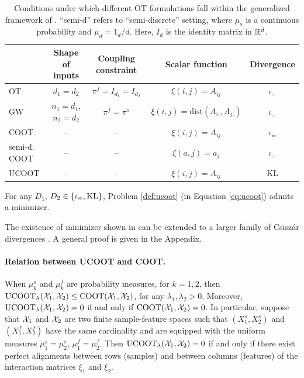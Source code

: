 \begin{table}[t]
  \centering
  \small
  \begin{tabular}{l *4c}
      \toprule
          & Shape of inputs & Coupling constraint & Scalar function & Divergence \\
      \midrule
      OT   & $d_1 = d_2$              & $\pi^f = I_{d_1} = I_{d_2}$ & $\xi(i, j) = A_{ij}$                        & $\iota_=$ \\
      GW   & $n_1 = d_1$, $n_2 = d_2$ & $\pi^f = \pi^s$             & $\xi(i, j) = \text{dist}( A_{i.}, A_{j.} )$ & $\iota_=$ \\
      COOT & --                       & --                          & $\xi(i, j) = A_{ij}$                        & $\iota_=$ \\
      semi-d. COOT & --               & --                          & $\xi(a, j) = a_j$                           & $\iota_=$ \\
      UCOOT & --                      & --                          & $\xi(i, j) = A_{ij}$                        & KL \\
        \bottomrule
        \hline
        \end{tabular}
        \caption{Conditions under which different OT formulations fall within
        the generalized framework of .
        ``semi-d'' refers to ``semi-discrete'' setting, where
        $\mu_s$ is a continuous probability and $\mu_d = 1_d/d$.
        Here, $I_d$ is the identity matrix in $\mathbb R^d$.
  \label{t:examples}}
\end{table}
\begin{proposition} \label{prop:existence}
For any $D_1$, $D_2 \in \{ \iota_{=}, \text{KL} \}$, Problem \eqref{def:ucoot} (in Equation \eqref{eq:ucoot})
admits a minimizer.
\end{proposition}

\begin{remark}
The existence of minimizer shown in 
can be extended to a larger family of Csiszár divergences \citep{Csiszar63}.
A general proof is given in the Appendix.
\end{remark}

\paragraph{Relation between UCOOT and COOT.} When $ \mu^s_k$ and $\mu^f_k$ are probability measures,
for $k=1,2$, then $\text{UCOOT}_{\lambda}(\mathcal X_1, \mathcal X_2) \leq \text{COOT}(\mathcal X_1, \mathcal X_2)$,
for any $\lambda_1, \lambda_2 > 0$.
Moreover, $\text{UCOOT}_{\lambda}(\mathcal X_1, \mathcal X_2) = 0$ if and only if $\text{COOT}(\mathcal X_1, \mathcal X_2) = 0$.
In particular, suppose that $\mathcal X_1$ and $\mathcal X_2$ are two finite sample-feature spaces
such that $(X^s_1, X^s_2)$ and $(X^f_1, X^f_2)$ have the same cardinality and
are equipped with the uniform measures $\mu_1^s = \mu_2^s$, $\mu_1^f = \mu_2^f$.
Then $\text{UCOOT}_{\lambda}(\mathcal X_1, \mathcal X_2) = 0$ if and only if
there exist perfect alignments between rows (samples) and between
columns (features) of the interaction matrices $\xi_1$ and $\xi_2$.

